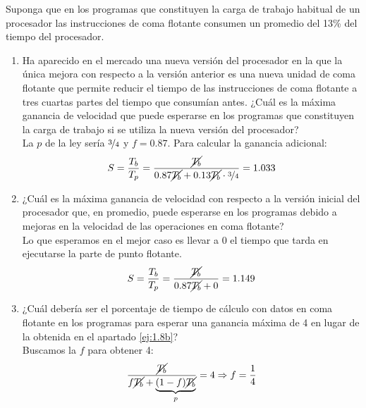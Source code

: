 \begin{ejercicio}
    Suponga que en los programas que constituyen la carga de trabajo habitual de un procesador las
    instrucciones de coma flotante consumen un promedio del 13\% del tiempo del procesador.
    \begin{enumerate}
        \item Ha aparecido en el mercado una nueva versión del procesador en la que la única mejora con respecto a la
        versión anterior es una nueva unidad de coma flotante que permite reducir el tiempo de las instrucciones de
        coma flotante a tres cuartas partes del tiempo que consumían antes. ¿Cuál es la máxima ganancia de
        velocidad que puede esperarse en los programas que constituyen la carga de trabajo si se utiliza la nueva
        versión del procesador?\\

        La $p$ de la ley sería $\nicefrac{3}{4}$ y $f = 0.87$.
        Para calcular la ganancia adicional:
        \begin{equation*}
            S = \dfrac{T_b}{T_p} = \dfrac{\cancel{T_b}}{0.87 \cancel{T_b} + 0.13\cancel{T_b}\cdot \nicefrac{3}{4}} = 1.033
        \end{equation*}

        \item\label{ej:1.8b} ¿Cuál es la máxima ganancia de velocidad con respecto a la versión inicial del procesador que, en
        promedio, puede esperarse en los programas debido a mejoras en la velocidad de las operaciones en coma
        flotante?\\

        Lo que esperamos en el mejor caso es llevar a 0 el tiempo que tarda en ejecutarse la parte de punto flotante.
        \begin{equation*}
            S = \dfrac{T_b}{T_p} = \dfrac{\cancel{T_b}}{0.87\cancel{T_b} + 0} = 1.149
        \end{equation*}

        \item\label{ej:1.8c} ¿Cuál debería ser el porcentaje de tiempo de cálculo con datos en coma flotante en los programas para
        esperar una ganancia máxima de 4 en lugar de la obtenida en el apartado \ref{ej:1.8b}?\\

        Buscamos la $f$ para obtener 4:
        \begin{equation*}
            \dfrac{\cancel{T_b}}{f\cancel{T_b} + \underbrace{(1-f)\cancel{T_b}}_{p}}= 4 \Rightarrow f = \dfrac{1}{4}
        \end{equation*}


\end{enumerate}
\end{ejercicio}
